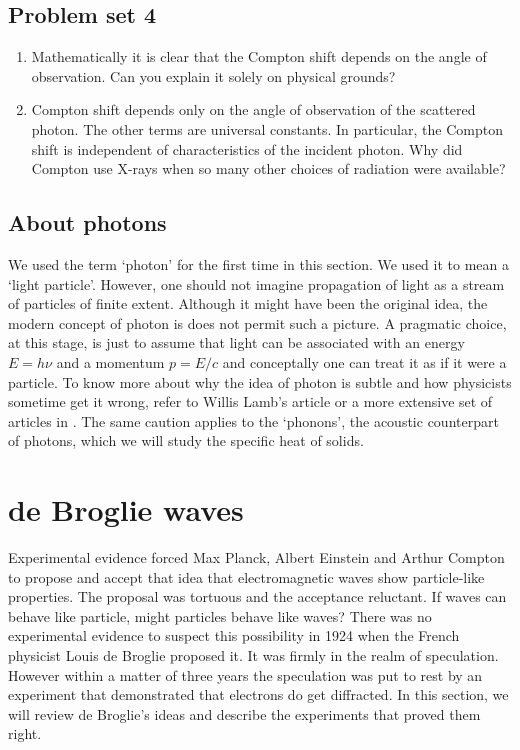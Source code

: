 \subsection{Problem set 4}
\begin{enumerate}
\item Mathematically it is clear that the Compton shift depends on the angle
of observation. Can you explain it solely on physical grounds?
\item Compton shift depends only on the angle of observation of the scattered
photon. The other terms are universal constants. In particular, the Compton
shift is independent of characteristics of the incident photon. Why did Compton
use X-rays when so many other choices of radiation were available?
\end{enumerate}

\subsection{About photons}
We used the term `photon' for the first time in this section. We used it to mean
a `light particle'. However, one should not imagine propagation of light as a
stream of particles of finite extent. Although it might have been the original
idea, the modern concept of photon is does not permit such a picture. A 
pragmatic choice, at this stage, is just to assume that light can be associated
with an energy $E = h\nu$ and a momentum $p = E/c$ and conceptally one can 
treat it as if it were a particle. To know more about why the idea of photon is
subtle and how physicists sometime get it wrong, refer to Willis Lamb's article
\cite{lamb1995anti} or a more extensive set of articles in 
\cite{roychoudhurioptics}. The same caution applies to the `phonons', the 
acoustic counterpart of photons, which we will study the specific heat of 
solids.

\section{de Broglie waves}\label{c2s4}
Experimental evidence forced Max Planck, Albert Einstein and Arthur Compton to
propose and accept that idea that electromagnetic waves show particle-like
properties. The proposal was tortuous and the acceptance reluctant. If
waves can behave like particle, might particles behave like waves? There was
no experimental evidence to suspect this possibility in 1924 when the French
physicist Louis de Broglie proposed it. It was firmly in the realm of 
speculation. However within a matter of three years the speculation was put to
rest by an experiment that demonstrated that electrons do get diffracted. In
this section, we will review de Broglie's ideas and describe the experiments
that proved them right.

